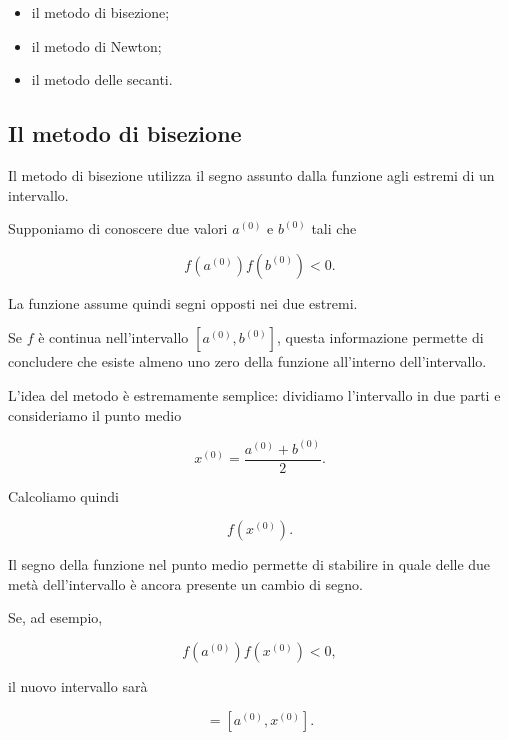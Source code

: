 \begin{itemize}
    \item il metodo di bisezione;
    \item il metodo di Newton;
    \item il metodo delle secanti.
\end{itemize}


\subsection{Il metodo di bisezione}

Il metodo di bisezione utilizza il segno assunto dalla funzione agli
estremi di un intervallo.

Supponiamo di conoscere due valori $a^{(0)}$ e $b^{(0)}$ tali che

\begin{equation*}
    f(a^{(0)})f(b^{(0)})<0.
    \label{eq:bisection_sign}
\end{equation*}

La funzione assume quindi segni opposti nei due estremi.

Se $f$ è continua nell'intervallo
$[a^{(0)},b^{(0)}]$, questa informazione permette di concludere che
esiste almeno uno zero della funzione all'interno dell'intervallo.

L'idea del metodo è estremamente semplice: dividiamo l'intervallo
in due parti e consideriamo il punto medio

\begin{equation*}
    x^{(0)}
    =
    \frac{a^{(0)}+b^{(0)}}{2}.
\end{equation*}

Calcoliamo quindi

\begin{equation*}
    f(x^{(0)}).
\end{equation*}

Il segno della funzione nel punto medio permette di stabilire in
quale delle due metà dell'intervallo è ancora presente un cambio
di segno.

Se, ad esempio,

\begin{equation*}
    f(a^{(0)})f(x^{(0)})<0,
\end{equation*}

il nuovo intervallo sarà

\begin{equation*}
    [a^{(1)},b^{(1)}]
    =
    [a^{(0)},x^{(0)}].
\end{equation*}

